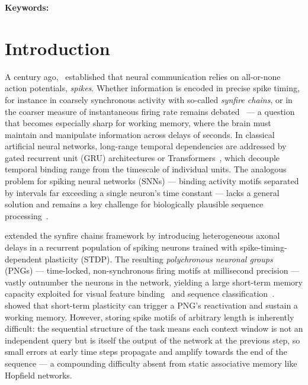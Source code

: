 \documentclass{scrartcl}
\title{\Title}
\author{
  \AuthorLP \\
  \texttt{\EmailLP} \\
  \Department \\
  \Affiliation \\
  \Street, \PostCode\ \City, \Country \\
  {\small\url{\WebsiteLP/publication/perrinet-26}}
}
\date{\today}
\newcommand{\citep}[1]{\parencite{#1}}
\newcommand{\citet}[1]{\textcite{#1}}
\begin{document}
\maketitle

\begin{abstract}
\Abstract
\end{abstract}
\noindent\textbf{Keywords:} \Keywords
%
\section{Introduction}

A century ago,~\citet{Adrian1926} established that neural communication relies on all-or-none action potentials, \emph{spikes}. Whether information is encoded in precise spike timing, for instance in coarsely synchronous activity with so-called \emph{synfire chains}, or in the coarser measure of instantaneous firing rate remains debated~\citep{Softky1993,Bohte2004,Grimaldi2023} --- a question that becomes especially sharp for working memory, where the brain must maintain and manipulate information across delays of seconds. In classical artificial neural networks, long-range temporal dependencies are addressed by gated recurrent unit (GRU) architectures or Transformers~\citep{Vaswani2017}, which decouple temporal binding range from the timescale of individual units. The analogous problem for spiking neural networks (SNNs) --- binding activity motifs separated by intervals far exceeding a single neuron's time constant --- lacks a general solution and remains a key challenge for biologically plausible sequence processing~\citep{Yin2026}.

\citet{Izhikevich2006} extended the synfire chains framework by introducing heterogeneous axonal delays in a recurrent population of spiking neurons trained with spike-timing-dependent plasticity (STDP). The resulting \emph{polychronous neuronal groups} (PNGs) --- time-locked, non-synchronous firing motifs at millisecond precision --- vastly outnumber the neurons in the network, yielding a large short-term memory capacity exploited for visual feature binding~\citep{Eguchi2018} and sequence classification~\citep{Paugam-Moisy2008}.~\citet{Szatmary2010} showed that short-term plasticity can trigger a PNG's reactivation and sustain a working memory. However, storing spike motifs of arbitrary length is inherently difficult: the sequential structure of the task means each context window is not an independent query but is itself the output of the network at the previous step, so small errors at early time steps propagate and amplify towards the end of the sequence --- a compounding difficulty absent from static associative memory like Hopfield networks.
\end{document}
